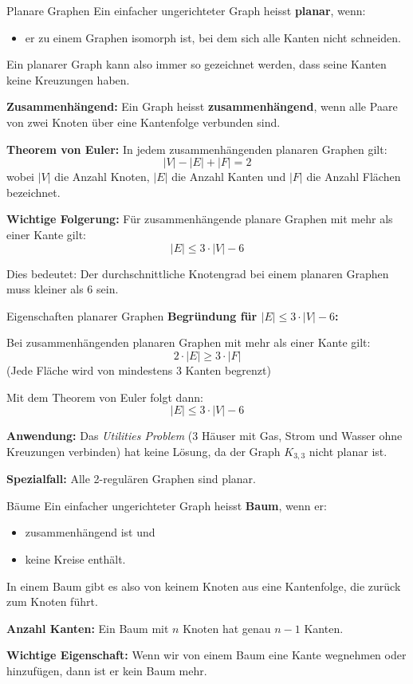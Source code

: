 \documentclass[a4paper, fontsize=7pt]{scrartcl}
\begin{document}
\begin{mainbox}{Planare Graphen}
Ein einfacher ungerichteter Graph heisst \textbf{planar}, wenn:

\begin{itemize}
    \item er zu einem Graphen isomorph ist, bei dem sich alle Kanten nicht schneiden.
\end{itemize}

Ein planarer Graph kann also immer so gezeichnet werden, dass seine Kanten keine Kreuzungen haben.

\textbf{Zusammenh\"angend:}
Ein Graph heisst \textbf{zusammenh\"angend}, wenn alle Paare von zwei Knoten \"uber eine Kantenfolge verbunden sind.

\textbf{Theorem von Euler:}
In jedem zusammenh\"angenden planaren Graphen gilt:
$$|V| - |E| + |F| = 2$$
wobei $|V|$ die Anzahl Knoten, $|E|$ die Anzahl Kanten und $|F|$ die Anzahl Fl\"achen bezeichnet.

\textbf{Wichtige Folgerung:}
F\"ur zusammenh\"angende planare Graphen mit mehr als einer Kante gilt:
$$|E| \leq 3 \cdot |V| - 6$$

Dies bedeutet: Der durchschnittliche Knotengrad bei einem planaren Graphen muss kleiner als 6 sein.
\end{mainbox}

\begin{subbox}{Eigenschaften planarer Graphen}
\textbf{Begr\"undung f\"ur $|E| \leq 3 \cdot |V| - 6$:}

Bei zusammenh\"angenden planaren Graphen mit mehr als einer Kante gilt:
$$2 \cdot |E| \geq 3 \cdot |F|$$
(Jede Fl\"ache wird von mindestens 3 Kanten begrenzt)

Mit dem Theorem von Euler folgt dann:
$$|E| \leq 3 \cdot |V| - 6$$

\textbf{Anwendung:}
Das \textit{Utilities Problem} (3 H\"auser mit Gas, Strom und Wasser ohne Kreuzungen verbinden) hat keine L\"osung, da der Graph $K_{3,3}$ nicht planar ist.

\textbf{Spezialfall:}
Alle 2-regul\"aren Graphen sind planar.
\end{subbox}

\begin{mainbox}{B\"aume}
Ein einfacher ungerichteter Graph heisst \textbf{Baum}, wenn er:

\begin{itemize}
    \item zusammenh\"angend ist und
    \item keine Kreise enth\"alt.
\end{itemize}

In einem Baum gibt es also von keinem Knoten aus eine Kantenfolge, die zur\"uck zum Knoten f\"uhrt.

\textbf{Anzahl Kanten:}
Ein Baum mit $n$ Knoten hat genau $n-1$ Kanten.

\textbf{Wichtige Eigenschaft:}
Wenn wir von einem Baum eine Kante wegnehmen oder hinzuf\"ugen, dann ist er kein Baum mehr.
\end{mainbox}
\end{document}

